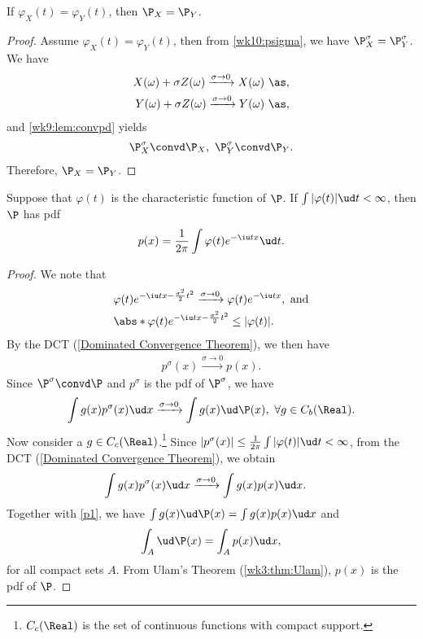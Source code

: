 \documentclass[../aipt.tex]{subfiles}
\begin{document}
\begin{Lemma}[Uniqueness]\label{wk10:Lemma2}
If $\varphi_X(t)=\varphi_Y(t)$, then $\P_X =\P_Y$.
\end{Lemma}
\begin{proof}
Assume $\varphi_X(t)=\varphi_Y(t)$, then from \cref{wk10:psigma}, we have $\P_X^{\sigma}=\P_Y^{\sigma}$. We have
\begin{align*}
X(\omega)+\sigma Z(\omega)\xrightarrow{\sigma\to 0}X(\omega)\ \as,\\
Y(\omega)+\sigma Z(\omega)\xrightarrow{\sigma\to 0}Y(\omega)\ \as,
\end{align*}
and \cref{wk9:lem:convpd} yields
\begin{align*}
\P^{\sigma}_{X}\convd \P_X,\
\P^{\sigma}_{Y}\convd \P_Y.
\end{align*}
Therefore, $\P_X=\P_Y$.
\end{proof}
%
\begin{Lemma}\label{wk10:Lemma3}
Suppose that $\varphi(t)$ is the characteristic function of $\P$. If $\int |\varphi(t)| \ud t <\infty$, then $\P$ has pdf 
\begin{align*}
p(x)=\frac{1}{2\pi}\int \varphi(t) e^{-\iu tx} \ud t.
\end{align*}
\end{Lemma}
\begin{proof}
We note that
\begin{align*}
&\varphi(t) e^{-\iu tx-\frac{\sigma^2}{2}t^2} \xrightarrow{\sigma \to 0} \varphi(t)e^{-\iu tx}, \text{ and}\\
&\abs*{\varphi(t) e^{-\iu tx-\frac{\sigma^2}{2}t^2}}	\leq |\varphi(t)|.\\
\end{align*}
By the DCT (\cref{Dominated Convergence Theorem}), we then have
\begin{align*}
p^{\sigma}(x)\xrightarrow{\sigma \to 0} p(x).
\end{align*}
Since $\P^{\sigma}\convd \P$ and $p^\sigma$ is the pdf of $\P^\sigma$, we have 
\begin{align}\label{p1}
\int g(x) p^{\sigma}(x)\ud x \xrightarrow{\sigma \to 0} \int g(x) \ud\P(x),\ \forall g \in C_b(\Real).
\end{align}
Now consider a $g\in C_c(\Real)$.\footnote{$C_c(\Real)$ is the set of continuous functions with compact support.} Since $|p^{\sigma}(x)| \leq  \frac{1}{2\pi} \int |\varphi(t)|\ud t < \infty $, from the DCT (\cref{Dominated Convergence Theorem}), we obtain
\begin{align*}
\int g(x) p^{\sigma}(x)\ud x 	&\xrightarrow{\sigma \to 0} \int g(x) p(x)\ud x.
\end{align*}
Together with \cref{p1}, we have $\int g(x) \ud\P(x) = \int g(x)p(x)\ud x$ and
\begin{align*}
\int_A \ud \P(x)=\int_A p(x) \ud x,
\end{align*}
for all compact sets $A$. From Ulam's Theorem (\cref{wk3:thm:Ulam}), $p(x)$ is the pdf of $\P$.
\end{proof}
\end{document}
